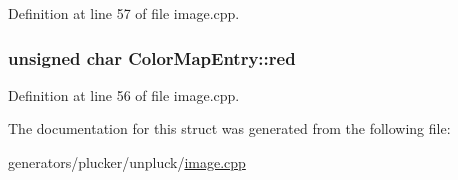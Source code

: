 Definition at line 57 of file image.\+cpp.

\hypertarget{structColorMapEntry_a9037199d7c8069a32d4ac0a144091c0e}{
\subsubsection[{red}]{\setlength{\rightskip}{0pt plus 5cm}unsigned char Color\+Map\+Entry\+::red}}\label{structColorMapEntry_a9037199d7c8069a32d4ac0a144091c0e}


Definition at line 56 of file image.\+cpp.



The documentation for this struct was generated from the following file\+:\begin{DoxyCompactItemize}
\item 
generators/plucker/unpluck/\hyperlink{image_8cpp}{image.\+cpp}\end{DoxyCompactItemize}
